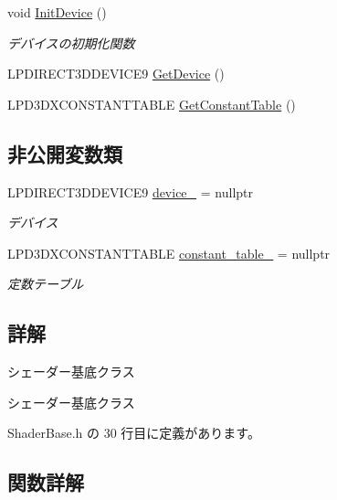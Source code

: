 \begin{DoxyCompactItemize}
void \mbox{\hyperlink{class_shader_base_aaac3419f1fce5bf12973e827daadbf8c}{Init\+Device}} ()
\begin{DoxyCompactList}\small\item\em デバイスの初期化関数 \end{DoxyCompactList}\item 
L\+P\+D\+I\+R\+E\+C\+T3\+D\+D\+E\+V\+I\+C\+E9 \mbox{\hyperlink{class_shader_base_a4601ff3d20f01800ffd676d3db8d9289}{Get\+Device}} ()
\item 
L\+P\+D3\+D\+X\+C\+O\+N\+S\+T\+A\+N\+T\+T\+A\+B\+LE \mbox{\hyperlink{class_shader_base_a85a5c17b56b6ffa29f7784ab42696d7c}{Get\+Constant\+Table}} ()
\end{DoxyCompactItemize}
\subsection*{非公開変数類}
\begin{DoxyCompactItemize}
\item 
L\+P\+D\+I\+R\+E\+C\+T3\+D\+D\+E\+V\+I\+C\+E9 \mbox{\hyperlink{class_shader_base_a15e4a4c1c1148433b9a0c60a7c32a366}{device\+\_\+}} = nullptr
\begin{DoxyCompactList}\small\item\em デバイス \end{DoxyCompactList}\item 
L\+P\+D3\+D\+X\+C\+O\+N\+S\+T\+A\+N\+T\+T\+A\+B\+LE \mbox{\hyperlink{class_shader_base_a9b6b2a5920dd57ac463040224fb64b68}{constant\+\_\+table\+\_\+}} = nullptr
\begin{DoxyCompactList}\small\item\em 定数テーブル \end{DoxyCompactList}\end{DoxyCompactItemize}


\subsection{詳解}
シェーダー基底クラス 

シェーダー基底クラス 

 Shader\+Base.\+h の 30 行目に定義があります。



\subsection{関数詳解}
\mbox{\label{class_shader_base_aef6fa922223d71fbec81464ebbfaf687}} 
